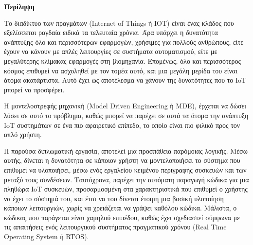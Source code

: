 \begin{center}
  \centering

  \vspace{0.5cm}
  \centering
  \textbf{\Large{Περίληψη}}

  \vspace{1cm}

\end{center}

Το διαδίκτυο των πραγμάτων (Internet of Things ή IOT) είναι ένας κλάδος που εξελίσσεται ραγδαία ειδικά τα τελευταία χρόνια. Άρα υπάρχει η δυνατότητα ανάπτυξης όλο και περισσότερων εφαρμογών, χρήσιμες για πολλούς ανθρώπους, είτε έχουν να κάνουν με απλές λειτουργίες σε συστήματα αυτοματισμού, είτε με μεγαλύτερης κλίμακας εφαρμογές στη βιομηχανία. Επομένως, όλο και περισσότερος κόσμος επιθυμεί να ασχοληθεί με τον τομέα αυτό, και μια μεγάλη μερίδα του είναι άτομα ακατάρτιστα. Αυτό έχει ως αποτέλεσμα να χάνουν της δυνατότητες που το IoT μπορεί να προσφέρει.

Η μοντελοστρεφής μηχανική (Model Driven Engineering ή MDE), έρχεται να δώσει λύσει σε αυτό το πρόβλημα, καθώς μπορεί να παρέχει σε αυτά τα άτομα την ανάπτυξη IoT συστημάτων σε ένα πιο αφαιρετικό επίπεδο, το οποίο είναι πιο φιλικό προς τον απλό χρήστη.

Η παρούσα διπλωματική εργασία, αποτελεί μια προσπάθεια παρόμοιας λογικής. Μέσω αυτής, δίνεται η δυνατότητα σε κάποιον χρήστη να μοντελοποιήσει το σύστημα που επιθυμεί να υλοποιήσει, μέσω ενός εργαλείου κειμένου περιγραφής συσκευών και των μεταξύ τους συνδέσεων. Ταυτόχρονα, παρέχει την αυτόματη παραγωγή κώδικα για μια πληθώρα IoT συσκευών, προσαρμοσμένη στα χαρακτηριστικά που επιθυμεί ο χρήστης να έχει το σύστημά του, και έτσι να του δίνεται έτοιμη μια βασική υλοποίηση κάποιων λειτουργιών, χωρίς να χρειάζεται να γράψει καθόλου κώδικα. Μάλιστα, ο κώδικας που παράγεται είναι χαμηλού επιπέδου, καθώς έχει σχεδιαστεί σύμφωνα με τις απαιτήσεις ενός λειτουργικού συστήματος πραγματικού χρόνου (Real Time Operating System ή RTOS).